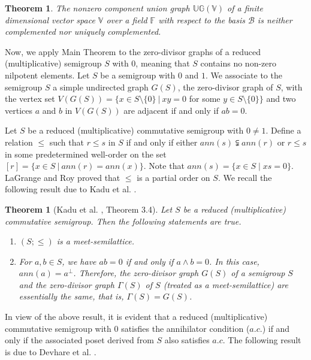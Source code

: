 \documentclass[10pt,one side,emlines]{amsart}
\newtheorem{theorem}[lem]{Theorem}
\newtheorem{thm}[lem]{Theorem}
\theoremstyle{definition}
\begin{document}
\begin{thm}
	The nonzero component union graph $\mathbb{UG(V)}$ of a finite dimensional vector space $\mathbb{V}$ over a field $\mathbb{F}$ with respect to the basis $\mathcal{B}$ is neither  complemented nor  uniquely complemented. 
\end{thm}



Now, we apply Main Theorem to the zero-divisor graphs of a reduced (multiplicative) semigroup $S$ with $0$, meaning that $S$ contains no non-zero nilpotent elements. Let $S$ be a semigroup with $0$ and $1$. We associate to the semigroup $S$ a simple undirected graph $G(S)$, the zero-divisor graph of $S$, with the vertex set	 $V(G(S)) = \{x\in S\setminus\{0\} ~|~ xy=0$ for some $y\in S\setminus\{0\}\}$
and two vertices $a$ and $b$ in $V(G(S))$ are adjacent if and only if $ab=0$. 


Let $S$ be a reduced (multiplicative) commutative semigroup with $0\neq 1$. Define
a relation $\leq $ such that $r\leq s$ in $S$ if and only if either $ann(s) \subsetneqq ann(r) $ or $r \leq s$ in some
predetermined well-order on the set $[r] = \{x \in S ~|~ ann(r) = ann(x)\}$. Note that $ann(s) =\{x \in S\; |\; xs=0 \}$. LaGrange and Roy \cite[Remark 3.4]{LR} proved that $\leq $ is a partial order on $S$.
We recall the following result due to  Kadu et al. \cite{KJG}.

\begin{theorem}[Kadu et al. \cite{KJG}, Theorem 3.4]\label{2.1} Let $S$ be a reduced (multiplicative) commutative semigroup. Then the following statements are true.
	\begin{enumerate}\item	$(S; \leq ) $ is a meet-semilattice. \item  For $a, b \in S$, we have $ab = 0$ if and only if $a\wedge b = 0$. In this case, $ann(a)=a^{\perp}$. Therefore, the zero-divisor graph $G(S)$ of a semigroup $S$ and the zero-divisor graph $\Gamma (S)$ of $S$ (treated as a meet-semilattice) are essentially the same, that is, $\Gamma (S) = G(S)$. 
	\end{enumerate}
\end{theorem}

In view of the above result, it is evident that a reduced (multiplicative) commutative semigroup with $0$ satisfies the annihilator condition ($a.c.$) if and only if the associated poset derived from $S$ also satisfies $a.c.$ The following result is due to Devhare et al. \cite{DJL}.
\end{document}
